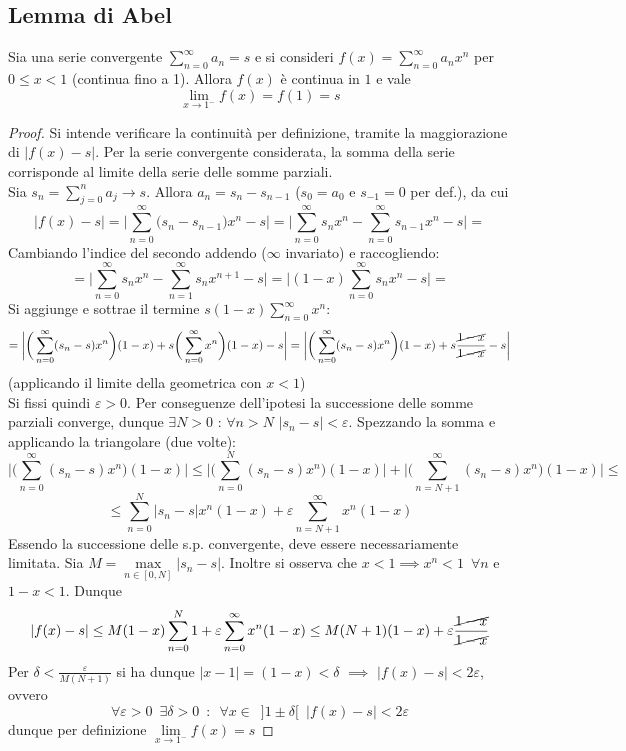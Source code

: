 \documentclass[10pt]{article}
\theoremstyle{plain}
\begin{document}
\subsection{Lemma di Abel}
\begin{lem}
Sia una serie convergente $\displaystyle \sum\limits_{n=0}^\infty a_n = s$ e si consideri $\displaystyle f(x) = \sum\limits_{n=0}^\infty a_n x^n$ per $0 \leq x < 1$ (continua fino a 1). Allora $f(x)$ è continua in $1$ e vale
\[\lim\limits_{x \rightarrow 1^-} f(x) = f(1) = s\]
\end{lem}
\begin{proof}
Si intende verificare la continuità per definizione, tramite la maggiorazione di $|f(x) - s|$. Per la serie convergente considerata, la somma della serie corrisponde al limite della serie delle somme parziali.
\\Sia $\displaystyle s_n = \sum\limits_{j=0}^n a_j \rightarrow s$. Allora $a_n = s_{n} - s_{n-1}$ ($s_0 = a_0$ e $s_{-1} = 0$ per def.), da cui
\[|f(x) - s| = \bigg|\sum\limits_{n=0}^\infty \big( s_{n} - s_{n-1}\big) x^n - s\bigg| = \bigg|\sum\limits_{n=0}^\infty s_n x^n - \sum\limits_{n=0}^\infty s_{n-1} x^n - s \bigg| =\]
Cambiando l'indice del secondo addendo ($\infty$ invariato) e raccogliendo:
\[= \bigg|\sum\limits_{n=0}^\infty s_n x^n - \sum\limits_{n=1}^\infty s_n x^{n+1} - s \bigg| = \bigg|(1-x) \sum\limits_{n=0}^\infty s_n x^n - s \bigg| = \]
Si aggiunge e sottrae il termine $\displaystyle s (1-x) \sum\limits_{n=0}^\infty x^n$:
\[= \bigg|\bigg(\sum\limits_{n=0}^\infty (s_n - s) x^n\bigg) (1-x) + s \bigg(\sum\limits_{n=0}^\infty x^n\bigg) (1-x) -s \bigg| = \bigg|\bigg(\sum\limits_{n=0}^\infty (s_n - s) x^n\bigg) (1-x) + s \frac{\cancel{1- x}}{\cancel{1 - x}} -s \bigg|\]
(applicando il limite della geometrica con $x < 1$)
\\Si fissi quindi $\varepsilon > 0$. Per conseguenze dell'ipotesi la successione delle somme parziali converge, dunque $\exists N > 0$ : $\forall n > N$ $|s_n - s| < \varepsilon$. Spezzando la somma e applicando la triangolare (due volte):
\[\bigg|\bigg(\sum\limits_{n=0}^\infty (s_n - s) x^n\bigg) (1-x)\bigg| \leq \bigg|\bigg(\sum\limits_{n=0}^N (s_n - s) x^n\bigg) (1-x)\bigg| + \bigg|\bigg(\sum\limits_{n=N+1}^\infty (s_n - s) x^n\bigg) (1-x)\bigg| \leq\]
\[ \leq \sum\limits_{n=0}^N |s_n - s| x^n (1-x) + \varepsilon \sum\limits_{n=N+1}^\infty x^n (1-x)\]
Essendo la successione delle s.p. convergente, deve essere necessariamente limitata. Sia $\displaystyle M = \max\limits_{n \in [0,N]} |s_n - s|$. Inoltre si osserva che $x < 1 \implies x^n < 1 \enspace \forall n$ e $1-x < 1$. Dunque
\[|f(x) - s| \leq M (1-x) \sum\limits_{n=0}^N 1 + \varepsilon \sum\limits_{n=0}^\infty x^n (1-x) \leq M (N+1) (1-x) + \varepsilon \frac{\cancel{1-x}}{\cancel{1-x}}\]
Per $\displaystyle \delta < \frac{\varepsilon}{M (N+1)}$ si ha dunque $|x - 1| = (1-x) < \delta$ $\implies$ $|f(x) - s| < 2 \varepsilon$, ovvero
\[\forall \varepsilon > 0 \enspace \exists \delta > 0 \enspace : \enspace \forall x \in \enspace ]1 \pm \delta[ \enspace |f(x) - s| < 2\varepsilon\]
dunque per definizione $\displaystyle \lim\limits_{x \rightarrow 1^-} f(x) = s$
\end{proof}
\end{document}
